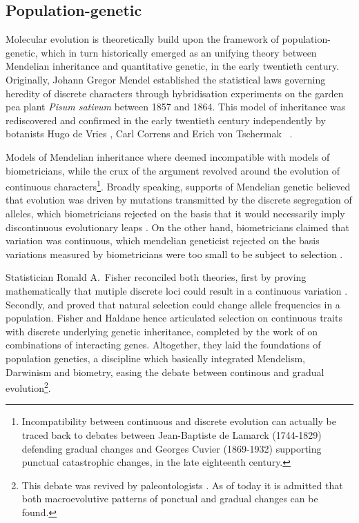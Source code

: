 \subsection{Population-genetic}
Molecular evolution is theoretically build upon the framework of population-genetic, which in turn historically emerged as an unifying theory between Mendelian inheritance and quantitative genetic, in the early twentieth century.
Originally,
Johann Gregor Mendel%
 established the statistical laws governing heredity of discrete characters through  hybridisation experiments on the garden pea plant \textit{Pisum sativum} between 1857 and 1864.
This model of inheritance was rediscovered and confirmed in the early twentieth century independently by botanists
Hugo de Vries%
, Carl Correns%
 and Erich von Tschermak%
\ \citep{dunn2003gregor}.

Models of Mendelian inheritance where deemed incompatible with models of biometricians, while the crux of the argument revolved around the evolution of continuous characters\footnote{Incompatibility between continuous and discrete evolution can actually be traced back to debates between Jean-Baptiste de Lamarck (1744-1829) defending gradual changes and Georges Cuvier (1869-1932) supporting punctual catastrophic changes, in the late eighteenth century.}.
Broadly speaking, supports of Mendelian genetic believed that evolution was driven by mutations transmitted by the discrete segregation of \glspl{allele}, which biometricians rejected on the basis that it would necessarily imply discontinuous evolutionary leaps \citep{bowler2003evolution}.
On the other hand, biometricians claimed that variation was continuous, which mendelian geneticist rejected on the basis variations measured by biometricians were too small to be subject to selection \citep{provine2001origins}.

Statistician Ronald A.\ Fisher reconciled both theories, first by proving mathematically that mutiple discrete loci could result in a continuous variation \citep{fisher1919xv}.
Secondly, \citet{fisher1930genetical} and \citet{haldane1932causes} proved that natural selection could change \gls{allele} frequencies in a population. 
Fisher and Haldane hence articulated selection on continuous traits with discrete underlying genetic inheritance, completed by the work of \citet{wright1932roles} on combinations of interacting genes.
Altogether, they laid the foundations of population genetics, a discipline which basically integrated Mendelism, Darwinism and biometry, easing the debate between continous and gradual evolution\footnote{This debate was revived by paleontologists \citet*{Gould1972}. As of today it is admitted that both macroevolutive patterns of ponctual and gradual changes can be found.}.

